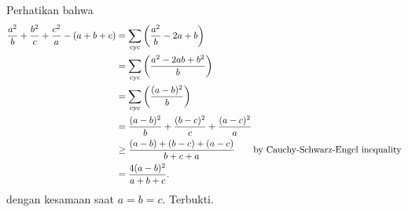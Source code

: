 
\begin{solusi}
Perhatikan bahwa
\begin{align*}
    \dfrac{a^2}{b}+\dfrac{b^2}{c}+\dfrac{c^2}{a} - (a+b+c) &= \sum_{\mathrm{cyc}} \left(\dfrac{a^2}{b}-2a+b\right) \\
    &= \sum_{\mathrm{cyc}} \left(\dfrac{a^2-2ab+b^2}{b}\right) \\
    &= \sum_{\mathrm{cyc}} \left(\dfrac{(a-b)^2}{b}\right) \\
    &= \dfrac{(a-b)^2}{b} + \dfrac{(b-c)^2}{c} + \dfrac{(a-c)^2}{a}\\
    &\geq \dfrac{(a-b)+(b-c)+(a-c)}{b+c+a} \qquad \text{by Cauchy-Schwarz-Engel inequality}\\
    &= \dfrac{4(a-b)^2}{a+b+c}.
\end{align*}
dengan kesamaan saat $a=b=c$. Terbukti.
\end{solusi}